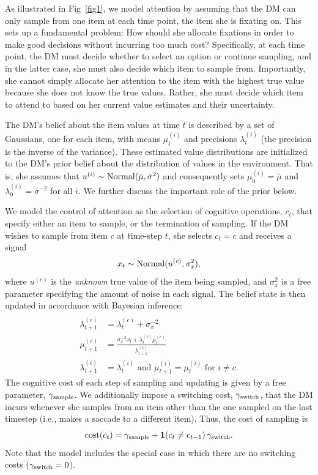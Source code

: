 As illustrated in Fig~\ref{fig1}, we model attention by assuming that the DM can only sample from one item at each time point, the item she is fixating on. This sets up a fundamental problem: How should she allocate fixations in order to make good decisions without incurring too much cost? Specifically, at each time point, the DM must decide whether to select an option or continue sampling, and in the latter case, she must also decide which item to sample from. Importantly, she cannot simply allocate her attention to the item with the highest true value because she does not know the true values. Rather, she must decide which item to attend to based on her current value estimates and their uncertainty. 

The DM's belief about the item values at time $t$ is described by a set of Gaussians, one for each item, with means $\mu_t^{(i)}$ and precisions $\lambda_t^{(i)}$ (the precision is the inverse of the variance). These estimated value distributions are initialized to the DM's prior belief about the distribution of values in the environment. That is, she assumes that $u^{(i)} \sim \mathrm{Normal}(\bar{\mu}, \bar{\sigma}^2)$ and consequently sets $\mu_0^{(i)} = \bar{\mu}$ and $\lambda_0^{(i)} = \bar{\sigma}^{-2}$ for all $i$. We further discuss the important role of the prior below.

We model the control of attention as the selection of cognitive operations, $c_t$, that specify either an item to sample, or the termination of sampling. If the DM wishes to sample from item $c$ at time-step $t$, she selects $c_t=c$ and receives a signal
\begin{equation}\label{eq:signal}
x_{t}\sim \mathrm{Normal}(u^{(c)},\sigma_{x}^{2}),  
\end{equation}
where $u^{(c)}$ is the \emph{unknown} true value of the item being sampled, and $\sigma_{x}^{2}$ is a free parameter specifying the amount of noise in each signal. The belief state is then updated in accordance with Bayesian inference:
\begin{equation}
  \label{eq:dynamics}
  \begin{aligned}\\
  \lambda_{t+1}^{(c)} & =\lambda_{t}^{(c)}+\sigma_{x}^{-2}\\
  \mu_{t+1}^{(c)} & =\frac{\sigma_{x}^{-2}x_{t}+\lambda_{t}^{(c)}\mu_{t}^{(c)}}{\lambda_{t+1}^{(c)}}\\
  \lambda_{t+1}^{(i)} & =\lambda_{t}^{(i)} 
    \text{ and } \mu_{t+1}^{(i)} =\mu_{t}^{(i)} \text{ for }i\neq c.
      \end{aligned}
\end{equation}
The cognitive cost of each step of sampling and updating is given by a free parameter, $\gamma_\text{sample}$. We additionally impose a switching cost, $\gamma_\text{switch}$, that the DM incurs whenever she samples from an item other than the one sampled on the last timestep (i.e., makes a saccade to a different item). Thus,
the cost of sampling is 
\begin{equation}
  \label{eq:cost}
  \text{cost}(c_t) = \gamma_\text{sample} + \mathbf{1}(c_{t}\neq c_{t-1})\,\gamma_\text{switch}.
\end{equation}
Note that the model includes the special case in which there are no switching costs ($\gamma_\text{switch}=0$).

